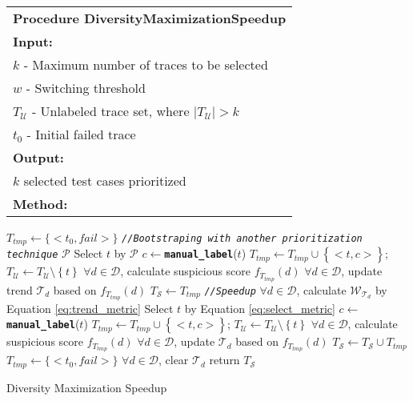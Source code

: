 
\begin{algorithm}[tb]
{
\centering

{
{%
\begin {tabular}[t]{l}
\textbf{Procedure DiversityMaximizationSpeedup}\\
\textbf{Input:}\\
\quad $k$ - Maximum number of traces to be selected\\
\quad $w$ - Switching threshold\\
\quad $T_\mathcal{U}$ - Unlabeled trace set, where $|T_\mathcal{U}|> k$\\
\quad $t_0$ - Initial failed trace\\
\textbf{Output:}\\
\quad $k$ selected test cases prioritized\\
\textbf{Method:}\\
\end{tabular}
\begin{algorithmic}[1]
	\STATE $T_{tmp} \leftarrow \{<t_0, fail>\}$
	\STATE \textit{\texttt{//Bootstraping with another prioritization technique}} $\mathcal{P}$
		\STATE Select $t$ by $\mathcal{P}$
		\STATE $c \leftarrow$\texttt{\textbf{manual\_label}}($t$)
		\STATE $T_{tmp} \leftarrow T_{tmp} \cup \left\{\right.<t, c>\left.\right\}$; $T_\mathcal{U}\leftarrow T_\mathcal{U} \setminus \left\{t\right\}$
		\STATE $\forall d \in \mathcal{D}$, calculate suspicious score $f_{T_{tmp}}(d)$
		\STATE $\forall d \in \mathcal{D}$, update trend $\mathcal{T}_{d}$ based on $f_{T_{tmp}}(d)$
	\ENDWHILE
	\STATE $T_\mathcal{S} \leftarrow T_{tmp}$
	\STATE \textit{\texttt{//Speedup}}
		\STATE $\forall d \in \mathcal{D}$, calculate $\mathcal{W}_{\mathcal{T}_{d}}$ by Equation \ref{eq:trend_metric}
		\STATE Select $t$ by Equation \ref{eq:select_metric}
		\STATE $c \leftarrow$\texttt{\textbf{manual\_label}}($t$)
		\STATE $T_{tmp} \leftarrow T_{tmp} \cup \left\{\right.<t, c>\left.\right\}$; $T_\mathcal{U}\leftarrow T_\mathcal{U} \setminus \left\{t\right\}$
		\STATE $\forall d \in \mathcal{D}$, calculate suspicious score $f_{T_{tmp}}(d)$
		\STATE $\forall d \in \mathcal{D}$, update $\mathcal{T}_{d}$ based on $f_{T_{tmp}}(d)$
		\STATE $T_\mathcal{S} \leftarrow T_\mathcal{S} \cup T_{tmp}$
			\STATE $T_{tmp} \leftarrow \{<t_0, fail>\}$
			\STATE $\forall d \in \mathcal{D}$, clear $\mathcal{T}_{d}$
		\ENDIF
	\ENDWHILE
	\STATE return $T_\mathcal{S}$
\end{algorithmic}
}
}
}
\caption{\small{Diversity Maximization Speedup}} \label{algo:DMS}
\end{algorithm}









